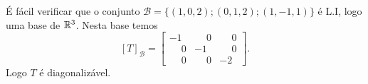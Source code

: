 \begin{exemplo}
\begin{enumerate}[label={\arabic*})]
\begin{solucao}
            \'E f\'acil verificar que o conjunto $\mathcal{B} = \{(1,0,2); (0,1,2); (1,-1,1)\}$ \'e L.I, logo uma base de $\mathbb{R}^3$. Nesta base temos
            \[
                [T]_\mathcal{B} = \begin{bmatrix}
                                -1 & \phantom{-}0 & \phantom{-}0\\
                                \phantom{-}0 & -1 & \phantom{-}0\\
                                \phantom{-}0 & \phantom{-}0 & -2
                            \end{bmatrix}.
            \]
            Logo $T$ \'e diagonaliz\'avel.
        \end{solucao}
    \end{enumerate}
\end{exemplo}

